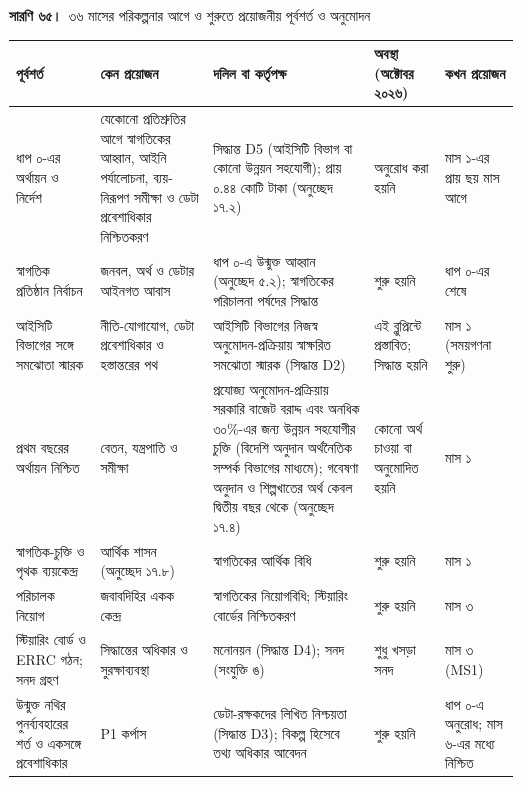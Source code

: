 \documentclass[border=10pt]{standalone}
\begin{document}
\begin{minipage}{17cm}
{\large\bfseries সারণি ৬৫।}\ {\large ৩৬ মাসের পরিকল্পনার আগে ও শুরুতে প্রয়োজনীয় পূর্বশর্ত ও অনুমোদন}\par\vspace{7pt}
\small
{}
\begin{tabularx}{\linewidth}{@{}>{\hsize=1.170\hsize\raggedright\arraybackslash}X>{\hsize=1.011\hsize\raggedright\arraybackslash}X>{\hsize=1.383\hsize\raggedright\arraybackslash}X>{\hsize=0.798\hsize\raggedright\arraybackslash}X>{\hsize=0.638\hsize\raggedright\arraybackslash}X@{}}
\arrayrulecolor{bapilrule}\toprule
\rowcolor{white}\textbf{পূর্বশর্ত} & \textbf{কেন প্রয়োজন} & \textbf{দলিল বা কর্তৃপক্ষ} & \textbf{অবস্থা (অক্টোবর ২০২৬)} & \textbf{কখন প্রয়োজন} \\
\midrule
ধাপ ০-এর অর্থায়ন ও নির্দেশ & যেকোনো প্রতিশ্রুতির আগে স্বাগতিকের আহ্বান, আইনি পর্যালোচনা, ব্যয়-নিরূপণ সমীক্ষা ও ডেটা প্রবেশাধিকার নিশ্চিতকরণ & সিদ্ধান্ত D5 (আইসিটি বিভাগ বা কোনো উন্নয়ন সহযোগী); প্রায় ০.৪৪ কোটি টাকা (অনুচ্ছেদ ১৭.২) & অনুরোধ করা হয়নি & মাস ১-এর প্রায় ছয় মাস আগে \\
স্বাগতিক প্রতিষ্ঠান নির্বাচন & জনবল, অর্থ ও ডেটার আইনগত আবাস & ধাপ ০-এ উন্মুক্ত আহ্বান (অনুচ্ছেদ ৫.২); স্বাগতিকের পরিচালনা পর্ষদের সিদ্ধান্ত & শুরু হয়নি & ধাপ ০-এর শেষে \\
আইসিটি বিভাগের সঙ্গে সমঝোতা স্মারক & নীতি-যোগাযোগ, ডেটা প্রবেশাধিকার ও হস্তান্তরের পথ & আইসিটি বিভাগের নিজস্ব অনুমোদন-প্রক্রিয়ায় স্বাক্ষরিত সমঝোতা স্মারক (সিদ্ধান্ত D2) & এই ব্লুপ্রিন্টে প্রস্তাবিত; সিদ্ধান্ত হয়নি & মাস ১ (সময়গণনা শুরু) \\
প্রথম বছরের অর্থায়ন নিশ্চিত & বেতন, যন্ত্রপাতি ও সমীক্ষা & প্রযোজ্য অনুমোদন-প্রক্রিয়ায় সরকারি বাজেট বরাদ্দ এবং অনধিক ৩০\%-এর জন্য উন্নয়ন সহযোগীর চুক্তি (বিদেশি অনুদান অর্থনৈতিক সম্পর্ক বিভাগের মাধ্যমে); গবেষণা অনুদান ও শিল্পখাতের অর্থ কেবল দ্বিতীয় বছর থেকে (অনুচ্ছেদ ১৭.৪) & কোনো অর্থ চাওয়া বা অনুমোদিত হয়নি & মাস ১ \\
স্বাগতিক-চুক্তি ও পৃথক ব্যয়কেন্দ্র & আর্থিক শাসন (অনুচ্ছেদ ১৭.৮) & স্বাগতিকের আর্থিক বিধি & শুরু হয়নি & মাস ১ \\
পরিচালক নিয়োগ & জবাবদিহির একক কেন্দ্র & স্বাগতিকের নিয়োগবিধি; স্টিয়ারিং বোর্ডের নিশ্চিতকরণ & শুরু হয়নি & মাস ৩ \\
স্টিয়ারিং বোর্ড ও ERRC গঠন; সনদ গ্রহণ & সিদ্ধান্তের অধিকার ও সুরক্ষাব্যবস্থা & মনোনয়ন (সিদ্ধান্ত D4); সনদ (সংযুক্তি ঙ) & শুধু খসড়া সনদ & মাস ৩ (MS1) \\
উন্মুক্ত নথির পুনর্ব্যবহারের শর্ত ও একসঙ্গে প্রবেশাধিকার & P1 কর্পাস & ডেটা-রক্ষকদের লিখিত নিশ্চয়তা (সিদ্ধান্ত D3); বিকল্প হিসেবে তথ্য অধিকার আবেদন & শুরু হয়নি & ধাপ ০-এ অনুরোধ; মাস ৬-এর মধ্যে নিশ্চিত \\

\end{tabularx}
\end{minipage}
\end{document}
